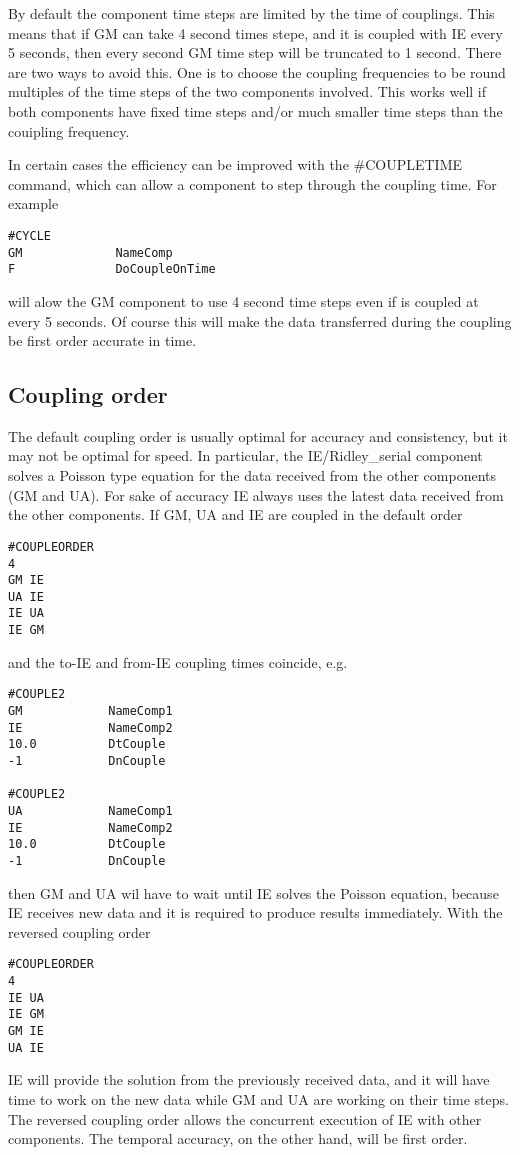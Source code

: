 By default the component time steps are limited by the
time of couplings. This means that if GM can take 4 second
times stepe, and it is coupled with IE every 5 seconds,
then every second GM time step will be truncated to 1 second.
There are two ways to avoid this. One is to choose the
coupling frequencies to be round multiples of the time steps
of the two components involved. This works well if both components
have fixed time steps and/or much smaller time steps than the 
couipling frequency.

In certain cases the efficiency can be improved with the
\#COUPLETIME command, which can allow a component to 
step through the coupling time. For example
\begin{verbatim}
#CYCLE
GM             NameComp
F              DoCoupleOnTime
\end{verbatim}
will alow the GM component to use 4 second time steps even
if is coupled at every 5 seconds. Of course this will
make the data transferred during the coupling be 
first order accurate in time.

\subsection{Coupling order}

The default coupling order is usually optimal for accuracy
and consistency, but it may not be optimal for speed.
In particular, the IE/Ridley\_serial component solves
a Poisson type equation for the data received from the 
other components (GM and UA). For sake of accuracy
IE always uses the latest data received from the other
components. If GM, UA and IE are coupled
in the default order
\begin{verbatim}
#COUPLEORDER
4
GM IE
UA IE
IE UA
IE GM
\end{verbatim}
and the to-IE and from-IE coupling times coincide, e.g.
\begin{verbatim}
#COUPLE2
GM            NameComp1
IE            NameComp2
10.0          DtCouple
-1            DnCouple

#COUPLE2
UA            NameComp1
IE            NameComp2
10.0          DtCouple
-1            DnCouple
\end{verbatim}
then GM and UA wil have to wait until IE solves
the Poisson equation, because IE receives new data
and it is required to produce results immediately.
With the reversed coupling order
\begin{verbatim}
#COUPLEORDER
4
IE UA
IE GM
GM IE
UA IE
\end{verbatim}
IE will provide the solution from the previously received data,
and it will have time to work on the new data while GM and UA
are working on their time steps. The reversed coupling order
allows the concurrent execution of IE with other components.
The temporal accuracy, on the other hand, will be first order.


